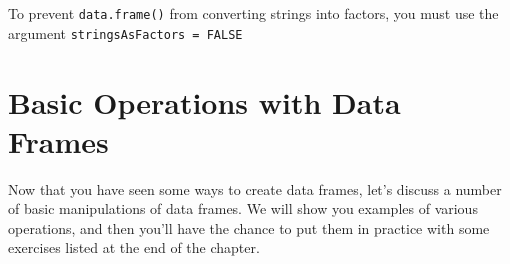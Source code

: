 \documentclass[
]{book}
\newenvironment{Shaded}{\begin{snugshade}}{\end{snugshade}}
\newcommand{\AttributeTok}[1]{\textcolor[rgb]{0.77,0.63,0.00}{#1}}
\newcommand{\CommentTok}[1]{\textcolor[rgb]{0.56,0.35,0.01}{\textit{#1}}}
\newcommand{\ConstantTok}[1]{\textcolor[rgb]{0.00,0.00,0.00}{#1}}
\newcommand{\DecValTok}[1]{\textcolor[rgb]{0.00,0.00,0.81}{#1}}
\newcommand{\FloatTok}[1]{\textcolor[rgb]{0.00,0.00,0.81}{#1}}
\newcommand{\FunctionTok}[1]{\textcolor[rgb]{0.00,0.00,0.00}{#1}}
\newcommand{\NormalTok}[1]{#1}
\newcommand{\OtherTok}[1]{\textcolor[rgb]{0.56,0.35,0.01}{#1}}
\newcommand{\StringTok}[1]{\textcolor[rgb]{0.31,0.60,0.02}{#1}}
\begin{document}
To prevent \texttt{data.frame()} from converting strings into factors, you must use
the argument \texttt{stringsAsFactors\ =\ FALSE}

\begin{Shaded}
\end{Shaded}

\hypertarget{basic-operations-with-data-frames}{%
\section{Basic Operations with Data Frames}\label{basic-operations-with-data-frames}}

Now that you have seen some ways to create data frames, let's discuss a number
of basic manipulations of data frames. We will show you examples of various
operations, and then you'll have the chance to put them in practice with some
exercises listed at the end of the chapter.
\end{document}
